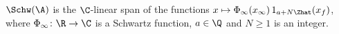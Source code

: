 $\Schw(\A)$ is the $\C$-linear span of the functions $x\mapsto\Phi_\infty(x_\infty)\,1_{a+N\Zhat}(x_f)$, where
$\Phi_\infty\colon\R\to\C$ is a Schwartz function, $a\in\Q$ and $N\ge1$ is an integer.
